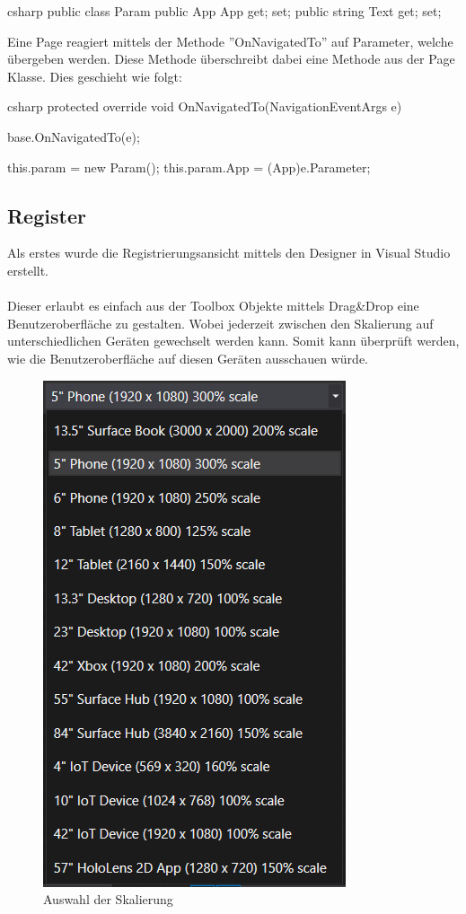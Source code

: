 \begin{code}{csharp}
	public class Param
	{
		public App App { get; set; }
		public string Text { get; set; }
	}
\end{code}

Eine Page reagiert mittels der Methode ''OnNavigatedTo'' auf Parameter, welche übergeben werden. Diese Methode überschreibt dabei eine Methode aus der Page Klasse. Dies geschieht wie folgt:

\begin{code}{csharp}
protected override void OnNavigatedTo(NavigationEventArgs e)
{
	base.OnNavigatedTo(e);
	
	this.param = new Param();
	this.param.App = (App)e.Parameter;
	
}
\end{code}

\subsection{Register}

Als erstes wurde die Registrierungsansicht mittels den Designer in Visual Studio erstellt.
\\\\
Dieser erlaubt es einfach aus der Toolbox Objekte mittels Drag\&Drop eine Benutzeroberfläche zu gestalten. Wobei jederzeit zwischen den Skalierung auf unterschiedlichen Geräten gewechselt werden kann. Somit kann überprüft werden, wie die Benutzeroberfläche auf diesen Geräten ausschauen würde.

\begin{figure}
	\centering
	\includegraphics[width=0.4\linewidth]{images/screenshot004}
	\caption{Auswahl der Skalierung}
	\label{fig:screenshot004}
\end{figure}

